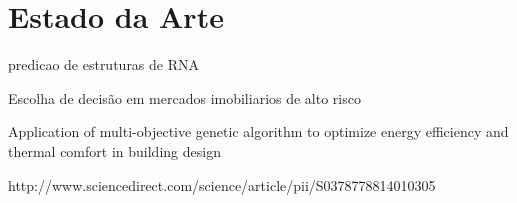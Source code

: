 \documentclass[]{article}
\begin{document}
\section{Estado da Arte}
	
	predicao de estruturas de RNA
    
    Escolha de decisão em mercados imobiliarios de alto risco
    
    Application of multi-objective genetic algorithm to optimize energy efficiency and thermal comfort in building design
    
    http://www.sciencedirect.com/science/article/pii/S0378778814010305
	

\newpage


\end{document}
